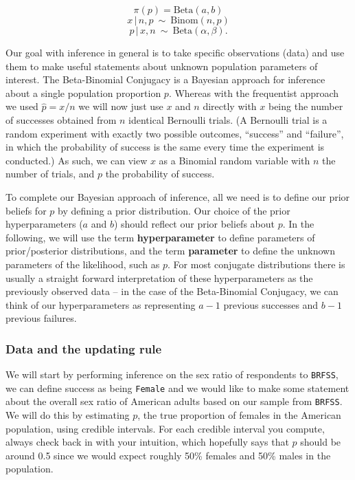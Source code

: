 \documentclass[
]{article}
\begin{document}
\[ \pi(p) = \text{Beta}(a, b) \]
\[ x\,|\,n,p ~\sim~ \text{Binom}(n,p) \]
\[ p \,|\, x,n ~\sim~ \text{Beta}(\alpha, \beta).\]

Our goal with inference in general is to take specific observations
(data) and use them to make useful statements about unknown population
parameters of interest. The Beta-Binomial Conjugacy is a Bayesian
approach for inference about a single population proportion \(p\).
Whereas with the frequentist approach we used \(\hat{p} = x / n\) we
will now just use \(x\) and \(n\) directly with \(x\) being the number
of successes obtained from \(n\) identical Bernoulli trials. (A
Bernoulli trial is a random experiment with exactly two possible
outcomes, ``success'' and ``failure'', in which the probability of
success is the same every time the experiment is conducted.) As such, we
can view \(x\) as a Binomial random variable with \(n\) the number of
trials, and \(p\) the probability of success.

To complete our Bayesian approach of inference, all we need is to define
our prior beliefs for \(p\) by defining a prior distribution. Our choice
of the prior hyperparameters (\(a\) and \(b\)) should reflect our prior
beliefs about \(p\). In the following, we will use the term
\textbf{hyperparameter} to define parameters of prior/posterior
distributions, and the term \textbf{parameter} to define the unknown
parameters of the likelihood, such as \(p\). For most conjugate
distributions there is usually a straight forward interpretation of
these hyperparameters as the previously observed data -- in the case of
the Beta-Binomial Conjugacy, we can think of our hyperparameters as
representing \(a-1\) previous successes and \(b-1\) previous failures.

\hypertarget{data-and-the-updating-rule}{%
\subsubsection{Data and the updating
rule}\label{data-and-the-updating-rule}}

We will start by performing inference on the sex ratio of respondents to
\texttt{BRFSS}, we can define success as being \texttt{Female} and we
would like to make some statement about the overall sex ratio of
American adults based on our sample from \texttt{BRFSS}. We will do this
by estimating \(p\), the true proportion of females in the American
population, using credible intervals. For each credible interval you
compute, always check back in with your intuition, which hopefully says
that \(p\) should be around 0.5 since we would expect roughly 50\%
females and 50\% males in the population.
\end{document}
